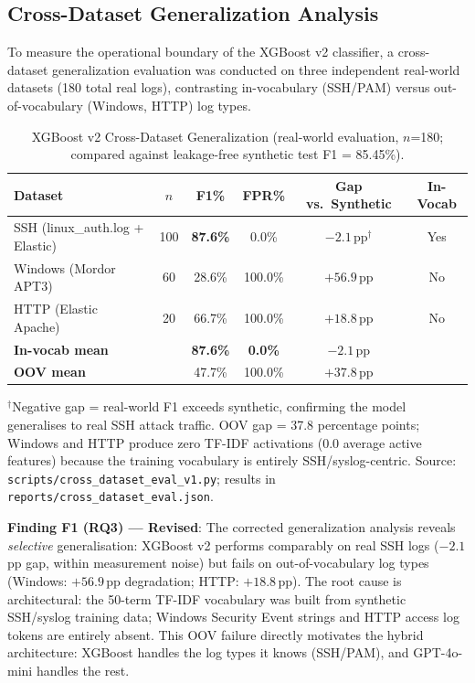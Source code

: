 \documentclass[futureinternet,article,submit,pdftex,moreauthors]{Definitions/mdpi}
\begin{document}
\subsection{Cross-Dataset Generalization Analysis}
\label{sec:cross}

To measure the operational boundary of the XGBoost v2 classifier, a cross-dataset
generalization evaluation was conducted on three independent real-world datasets
(180 total real logs), contrasting in-vocabulary (SSH/PAM) versus out-of-vocabulary
(Windows, HTTP) log types.

\begin{table}[H]
\caption{XGBoost v2 Cross-Dataset Generalization (real-world evaluation, $n$=180;
compared against leakage-free synthetic test F1 = 85.45\%).\label{tab:generalization}}
\begin{tabularx}{\textwidth}{lCCCCC}
\toprule
\textbf{Dataset} & \textbf{$n$} & \textbf{F1\%} & \textbf{FPR\%} & \textbf{Gap vs.\ Synthetic} & \textbf{In-Vocab} \\
\midrule
SSH (linux\_auth.log + Elastic)   & 100 & \textbf{87.6\%} & 0.0\%  & $-2.1$\,pp$^\dagger$ & Yes \\
Windows (Mordor APT3)             &  60 &  28.6\%         & 100.0\%& $+56.9$\,pp           & No  \\
HTTP (Elastic Apache)             &  20 &  66.7\%         & 100.0\%& $+18.8$\,pp           & No  \\
\midrule
\textbf{In-vocab mean}            &    & \textbf{87.6\%} & \textbf{0.0\%} & $-2.1$\,pp & \\
\textbf{OOV mean}                 &    & 47.7\%           & 100.0\% & $+37.8$\,pp & \\
\bottomrule
\end{tabularx}
{\footnotesize $^\dagger$Negative gap = real-world F1 exceeds synthetic, confirming the model
generalises to real SSH attack traffic. OOV gap = 37.8 percentage points; Windows and HTTP
produce zero TF-IDF activations (0.0 average active features) because the training vocabulary
is entirely SSH/syslog-centric. Source: \texttt{scripts/cross\_dataset\_eval\_v1.py};
results in \texttt{reports/cross\_dataset\_eval.json}.}
\end{table}

\textbf{Finding F1 (RQ3) --- Revised}: The corrected generalization analysis reveals
\textit{selective} generalisation: XGBoost v2 performs comparably on real SSH logs
($-2.1$\,pp gap, within measurement noise) but fails on out-of-vocabulary log types
(Windows: $+56.9$\,pp degradation; HTTP: $+18.8$\,pp). The root cause is architectural:
the 50-term TF-IDF vocabulary was built from synthetic SSH/syslog training data; Windows
Security Event strings and HTTP access log tokens are entirely absent. This OOV failure
directly motivates the hybrid architecture: XGBoost handles the log types it knows
(SSH/PAM), and GPT-4o-mini handles the rest.
\end{document}
